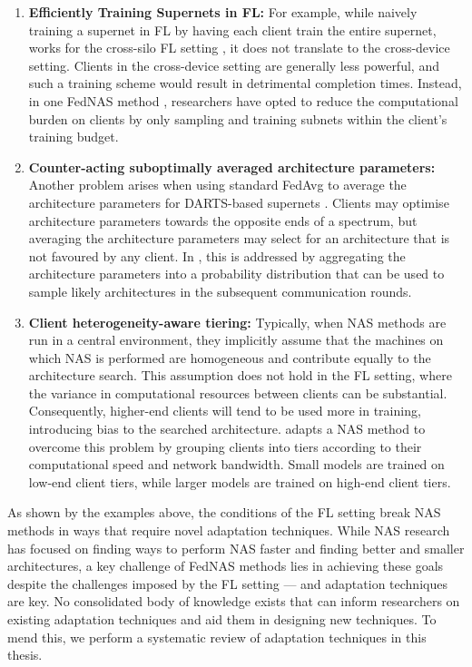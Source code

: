 \begin{enumerate}
    \item \textbf{Efficiently Training Supernets in FL:} For example, while naively training a supernet in FL by having each client train the entire supernet, works for the cross-silo FL setting \cite{fednas_2021}, it does not translate to the cross-device setting. Clients in the cross-device setting are generally less powerful, and such a training scheme would result in detrimental completion times. Instead, in one FedNAS method \cite{fedoras_2022}, researchers have opted to reduce the computational burden on clients by only sampling and training subnets within the client's training budget.
    \item \textbf{Counter-acting suboptimally averaged architecture parameters:} Another problem arises when using standard FedAvg to average the architecture parameters for DARTS-based supernets \cite{darts_2019}. Clients may optimise architecture parameters towards the opposite ends of a spectrum, but averaging the architecture parameters may select for an architecture that is not favoured by any client. In \cite{efnas_2024}, this is addressed by aggregating the architecture parameters into a probability distribution that can be used to sample likely architectures in the subsequent communication rounds.
    \item \textbf{Client heterogeneity-aware tiering:} Typically, when NAS methods are run in a central environment, they implicitly assume that the machines on which NAS is performed are homogeneous and contribute equally to the architecture search. This assumption does not hold in the FL setting, where the variance in computational resources between clients can be substantial. Consequently, higher-end clients will tend to be used more in training, introducing bias to the searched architecture. \cite{network_aware_fed_nas_2025} adapts a NAS method to overcome this problem by grouping clients into tiers according to their computational speed and network bandwidth. Small models are trained on low-end client tiers, while larger models are trained on high-end client tiers.
\end{enumerate}

As shown by the examples above, the conditions of the FL setting break NAS methods in ways that require novel adaptation techniques. While NAS research has focused on finding ways to perform NAS faster and finding better and smaller architectures, a key challenge of FedNAS methods lies in achieving these goals despite the challenges imposed by the FL setting — and adaptation techniques are key. No consolidated body of knowledge exists that can inform researchers on existing adaptation techniques and aid them in designing new techniques. To mend this, we perform a systematic review of adaptation techniques in this thesis. 

